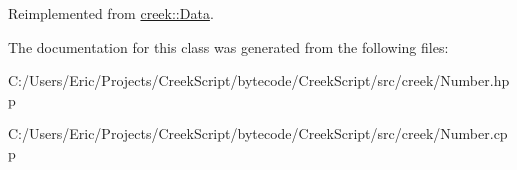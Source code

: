 Reimplemented from \hyperlink{classcreek_1_1_data_a32fa079c6f972eae802a5ac5b83d8a07}{creek\+::\+Data}.



The documentation for this class was generated from the following files\+:\begin{DoxyCompactItemize}
\item 
C\+:/\+Users/\+Eric/\+Projects/\+Creek\+Script/bytecode/\+Creek\+Script/src/creek/Number.\+hpp\item 
C\+:/\+Users/\+Eric/\+Projects/\+Creek\+Script/bytecode/\+Creek\+Script/src/creek/Number.\+cpp\end{DoxyCompactItemize}
